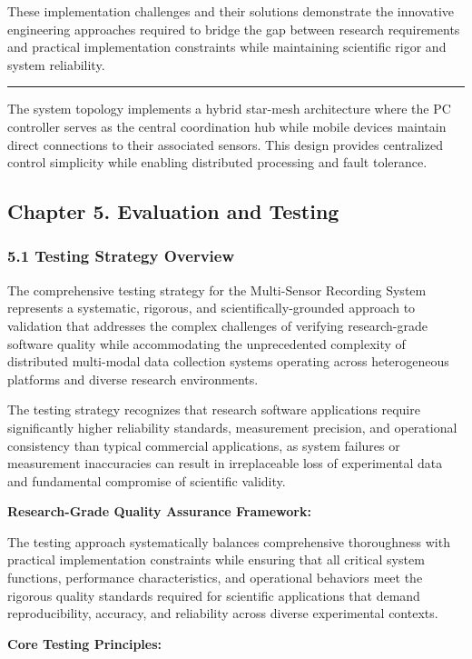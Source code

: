 \documentclass[12pt,a4paper]{report}
\begin{document}
These implementation challenges and their solutions demonstrate the innovative engineering approaches required to bridge
the gap between research requirements and practical implementation constraints while maintaining scientific rigor and
system reliability.

\hrule

The system topology implements a hybrid star-mesh architecture where the PC controller serves as the central
coordination hub while mobile devices maintain direct connections to their associated sensors. This design provides
centralized control simplicity while enabling distributed processing and fault tolerance.

\subsection{Chapter 5. Evaluation and Testing}

\subsubsection{5.1 Testing Strategy Overview}

The comprehensive testing strategy for the Multi-Sensor Recording System represents a systematic, rigorous, and
scientifically-grounded approach to validation that addresses the complex challenges of verifying research-grade
software quality while accommodating the unprecedented complexity of distributed multi-modal data collection systems
operating across heterogeneous platforms and diverse research environments.

The testing strategy recognizes that research software applications require significantly higher reliability standards,
measurement precision, and operational consistency than typical commercial applications, as system failures or
measurement inaccuracies can result in irreplaceable loss of experimental data and fundamental compromise of scientific
validity.

\textbf{Research-Grade Quality Assurance Framework:}

The testing approach systematically balances comprehensive thoroughness with practical implementation constraints while
ensuring that all critical system functions, performance characteristics, and operational behaviors meet the rigorous
quality standards required for scientific applications that demand reproducibility, accuracy, and reliability across
diverse experimental contexts.

\textbf{Core Testing Principles:}
\end{document}
